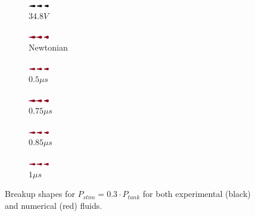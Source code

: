 \documentclass[onecolumn, 12pt]{asme2ej}
\begin{document}
\begin{figure}[h]

    \begin{subfigure}[t]{1.2cm}
        \centering
        \includegraphics[angle=-90,origin=c,width=0.9cm]{Figures/Fig14a.eps}        
        \caption{34.8$V$}
    \end{subfigure}
    \hfill
    \begin{subfigure}[t]{1.2cm}
        \centering
        \includegraphics[angle=-90,origin=c,width=0.9cm]{Figures/Fig14b.eps}

        \caption{Newtonian}
    \end{subfigure}
    \hfill
    \begin{subfigure}[t]{1.2cm}
        \centering
        \includegraphics[angle=-90,origin=c,width=0.9cm]{Figures/Fig14c.eps}
        \caption{$0.5\mu s$}
    \end{subfigure}\hfill
    \begin{subfigure}[t]{1.2cm}
        \centering
        \includegraphics[angle=-90,origin=c,width=0.9cm]{Figures/Fig14d.eps}
        \caption{$0.75\mu s$}
    \end{subfigure}
    \hfill
    \begin{subfigure}[t]{1.2cm}
        \centering
        \includegraphics[angle=-90,origin=c,width=0.9cm]{Figures/Fig14e.eps}
        \caption{$0.85\mu s$}
    \end{subfigure}
    \hfill
    \begin{subfigure}[t]{1.2cm}
        \centering
        \includegraphics[angle=-90,origin=c,width=0.9cm]{Figures/Fig14f.eps}
        \caption{$1\mu s$}
    \end{subfigure}
       \caption{Breakup shapes for $P_{stim}=0.3\cdot P_{tank}$ for both experimental (black) and numerical (red) fluids.}
       \label{fig:A3}
\end{figure}
\end{document}
